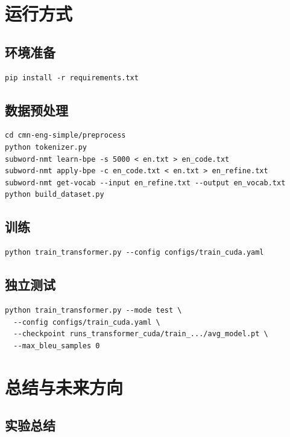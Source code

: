 \documentclass[12pt, a4paper]{ctexart}
\begin{document}
\section{运行方式}

\subsection{环境准备}
\begin{lstlisting}[style=bash, numbers=none]
pip install -r requirements.txt
\end{lstlisting}

\subsection{数据预处理}
\begin{lstlisting}[style=bash, numbers=none]
cd cmn-eng-simple/preprocess
python tokenizer.py
subword-nmt learn-bpe -s 5000 < en.txt > en_code.txt
subword-nmt apply-bpe -c en_code.txt < en.txt > en_refine.txt
subword-nmt get-vocab --input en_refine.txt --output en_vocab.txt
python build_dataset.py
\end{lstlisting}

\subsection{训练}
\begin{lstlisting}[style=bash, numbers=none]
python train_transformer.py --config configs/train_cuda.yaml
\end{lstlisting}

\subsection{独立测试}
\begin{lstlisting}[style=bash, numbers=none, basicstyle=\footnotesize\ttfamily]
python train_transformer.py --mode test \
  --config configs/train_cuda.yaml \
  --checkpoint runs_transformer_cuda/train_.../avg_model.pt \
  --max_bleu_samples 0
\end{lstlisting}

\section{总结与未来方向}

\subsection{实验总结}
\end{document}
